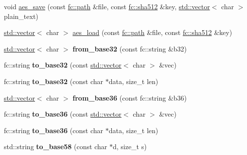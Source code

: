 \begin{DoxyCompactItemize}
\item 
void \mbox{\hyperlink{namespacefc_a8373bafd21e20c371b433c3a4ea2161f}{aes\+\_\+save}} (const \mbox{\hyperlink{classfc_1_1path}{fc\+::path}} \&file, const \mbox{\hyperlink{classfc_1_1sha512}{fc\+::sha512}} \&key, \mbox{\hyperlink{classstd_1_1vector}{std\+::vector}}$<$ char $>$ plain\+\_\+text)
\item 
\mbox{\hyperlink{classstd_1_1vector}{std\+::vector}}$<$ char $>$ \mbox{\hyperlink{namespacefc_a971e5743b54d7c728f068af266a9e6f1}{aes\+\_\+load}} (const \mbox{\hyperlink{classfc_1_1path}{fc\+::path}} \&file, const \mbox{\hyperlink{classfc_1_1sha512}{fc\+::sha512}} \&key)
\item 
\mbox{\label{namespacefc_a7e0ee723a0f5a89960fb483bc6e4b3a3}} 
\mbox{\hyperlink{classstd_1_1vector}{std\+::vector}}$<$ char $>$ {\bfseries from\+\_\+base32} (const fc\+::string \&b32)
\item 
\mbox{\label{namespacefc_a7d3be19a2b98a8eb765213ec1753c51d}} 
fc\+::string {\bfseries to\+\_\+base32} (const \mbox{\hyperlink{classstd_1_1vector}{std\+::vector}}$<$ char $>$ \&vec)
\item 
\mbox{\label{namespacefc_ac19e2510f785035f90b6fe9e4d6cc8fa}} 
fc\+::string {\bfseries to\+\_\+base32} (const char $\ast$data, size\+\_\+t len)
\item 
\mbox{\label{namespacefc_a15e97c2580fda902a3ae94beb5288b7f}} 
\mbox{\hyperlink{classstd_1_1vector}{std\+::vector}}$<$ char $>$ {\bfseries from\+\_\+base36} (const fc\+::string \&b36)
\item 
\mbox{\label{namespacefc_a6f2f19aa8654427b9c9fd4a2ddf1c2de}} 
fc\+::string {\bfseries to\+\_\+base36} (const \mbox{\hyperlink{classstd_1_1vector}{std\+::vector}}$<$ char $>$ \&vec)
\item 
\mbox{\label{namespacefc_ae5802edd2c08cd4ab7649485d04f5455}} 
fc\+::string {\bfseries to\+\_\+base36} (const char $\ast$data, size\+\_\+t len)
\item 
\mbox{\label{namespacefc_ad2cac4c10fd7906fd43da935e2a59740}} 
std\+::string {\bfseries to\+\_\+base58} (const char $\ast$d, size\+\_\+t s)
\item 

\end{DoxyCompactItemize}
